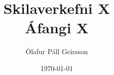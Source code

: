 \documentclass[10pt, a4paper]{article}
\def \course {Áfangi X}
\def \verkname {Skilaverkefni X}
\begin{document}
\title{\verkname \\ \small{\course}}
\author{Ólafur Páll Geirsson}
\date{\today}
\maketitle
\section*{}
       
\end{document}

